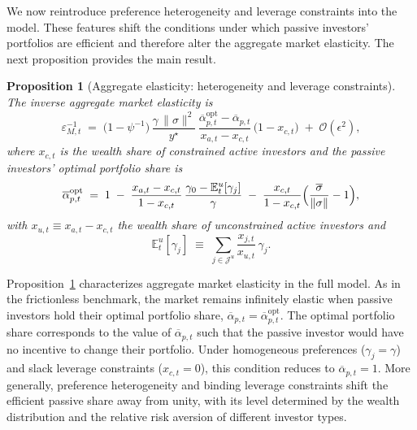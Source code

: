 \documentclass[12pt,english]{article}
\newtheorem{prop}{Proposition}
\begin{document}
We now reintroduce preference heterogeneity and leverage constraints into the model. These features shift the conditions under which passive investors’ portfolios are efficient and therefore alter the aggregate market elasticity. The next proposition provides the main result.

\begin{prop}[Aggregate elasticity: heterogeneity and leverage constraints]\label{prop_elasticity_pref_heterog}
The inverse aggregate market elasticity is
\begin{equation}\label{eq:elasticity_pref_heterog}
    \varepsilon_{M,t}^{-1}
    \;=\;
    \bigl(1-\psi^{-1}\bigr)\,
    \frac{\gamma\,\|\sigma\|^{2}}{y^\star}\,
    \frac{\overline{\alpha}_{p,t}^{\mathrm{opt}}-\overline{\alpha}_{p,t}}{x_{a,t}-x_{c,t}}\,
    \bigl(1-x_{c,t}\bigr)
    \;+\;\mathcal{O}\!\left(\epsilon^{2}\right),
\end{equation}
where $x_{c,t}$ is the wealth share of constrained active investors and the passive investors’ optimal portfolio share is
\begin{equation}\label{eq:optimal_alpha_p}
    \overline{\alpha}_{p,t}^{\mathrm{opt}}
    \;=\;
    1
    \;-\;
    \frac{x_{a,t}-x_{c,t}}{1-x_{c,t}}\,
    \frac{\gamma_{0}-\mathbb{E}^{u}_{t}[\gamma_{j}]}{\gamma}
    \;-\;
    \frac{x_{c,t}}{1-x_{c,t}}
    \Bigl(\frac{\overline{\sigma}}{\|\sigma\|}-1\Bigr),
\end{equation}
with $x_{u,t}\equiv x_{a,t}-x_{c,t}$ the wealth share of unconstrained active investors and 
\[
    \mathbb{E}^{u}_{t}[\gamma_{j}]
    \;\equiv\;
    \sum_{j\in\mathcal{J}^{u}}\frac{x_{j,t}}{x_{u,t}}\,\gamma_{j}.
\]
\end{prop}

Proposition~\ref{prop_elasticity_pref_heterog} characterizes aggregate market elasticity in the full model. As in the frictionless benchmark, the market remains infinitely elastic when passive investors hold their optimal portfolio share, $\overline{\alpha}_{p,t}=\overline{\alpha}_{p,t}^{\mathrm{opt}}$. 
The optimal portfolio share corresponds to the value of $\overline{\alpha}_{p,t}$ such that the passive investor would have no incentive to change their portfolio. 
Under homogeneous preferences ($\gamma_j=\gamma$) and slack leverage constraints ($x_{c,t}=0$), this condition reduces to $\overline{\alpha}_{p,t}=1$. More generally, preference heterogeneity and binding leverage constraints shift the efficient passive share away from unity, with its level determined by the wealth distribution and the relative risk aversion of different investor types.
\end{document}
